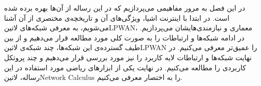 
در این فصل به مرور مفاهیمی می‌پردازیم که در این رساله از آن‌ها بهره برده شده است. در ابتدا با اینترنت اشیا، ویژگی‌های آن و تاریخچه‌ی مختصری از آن آشنا می‌شویم،
به معرفی شبکه‌های ‌لاتین{LPWAN}، معماری و نیازمندی‌هایشان
می‌پردازیم. در ادامه شبکه‌ها و ارتباطات را به صورت کلی مورد مطالعه قرار می‌دهیم و از بین طیف گسترده‌ی این شبکه‌ها، چند شبکه‌ی ‌لاتین{LPWAN} را عمیق‌تر
معرفی می‌کنیم. در نهایت شبکه‌ها و ارتباطات لایه کاربرد را نیز مورد بررسی قرار می‌دهیم و چند پروتکل کاربردی را مطالعه می‌کنیم. در نهایت یکی از ابزارهای ریاضی
مورد استفاده در این رساله، ‌لاتین{Network Calculus} را به اختصار معرفی می‌کنیم.


% 
% 






% 
% 

